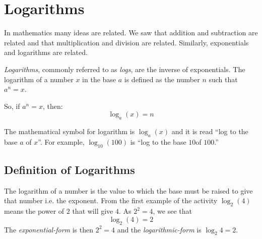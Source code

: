 \chapter{Logarithms}
\label{m:f12:logarithms}


In mathematics many ideas are related. We saw that addition and subtraction are related and that multiplication and division are related. Similarly, exponentials and logarithms are related. 

\textit{Logarithms}, commonly referred to as \textit{logs}, are the inverse of exponentials. The logarithm of a number $x$ in the base $a$ is defined as the number $n$ such that $a^n = x$. 

So, if $a^n = x$, then:
\begin{equation}
\label{eq:mn:l}
\log_{a}(x) = n
\end{equation}


The mathematical symbol for logarithm is $\log_{a}(x)$ and it is read ``log to the base $a$ of $x$''. For example, $\log_{10}(100)$ is ``log to the base $10$of $100$.''



\section{Definition of Logarithms}
The logarithm of a number is the value to which the base must be raised to give that number i.e. the exponent.  From the first example of the activity $\log_{2}(4)$ means the power of $2$ that will give $4$.  As $2^2=4$, we see that
\begin{equation} 
\log_{2}(4) = 2
\end{equation}
The \textit{exponential-form} is then $2^2 = 4$  and the \textit{logarithmic-form} is $\log_{2}4=2$.

